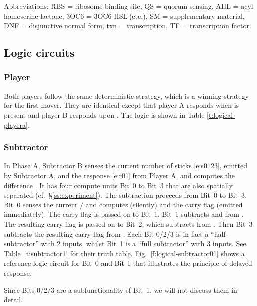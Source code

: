 \documentclass[12pt,notitlepage]{article}
\begin{document}
%
%

Abbreviations:
RBS = ribosome binding site,
QS = quorum sensing,
AHL = acyl homoserine lactone,
{3OC6} = {3OC6}{-}HSL (etc.),
SM = supplementary material,
DNF = disjunctive normal form,
txn = transcription,
TF = transcription factor.  %


\subsection{Logic circuits}


\subsubsection*{Player} \label{ss:players}

Both players
follow the same deterministic strategy,
which is a winning strategy for the first-mover.
%
They are identical except
that player A responds when  is present
and player B responds upon .
%
The logic is shown in Table \ref{t:logical-playera}.


\subsubsection*{Subtractor} \label{ss:sub}

In Phase A,
Subtractor B 
senses the current number of sticks \eqref{e:s0123},
emitted by Subtractor A,
and 
the response \eqref{e:r01} from Player A,
and
computes the difference .
%
It has four compute units Bit~0 to Bit~3
that are also
spatially separated (cf.~\S\ref{ss:experiment}). 
%
The subtraction proceeds from Bit~0 to Bit~3.
%
Bit~0 senses the current /
and computes  (silently)
and the carry flag  (emitted immediately).
%
The carry flag is passed on to Bit~1.
%
Bit~1 subtracts  and  from . 
%
The resulting carry flag  
is passed on to Bit~2, 
which subtracts  from .
%
Then Bit~3 subtracts the resulting carry flag
 from .
%
Each Bit 0/2/3
is in fact a ``half-subtractor'' with 2 inputs,
whilst
Bit~1 is a ``full subtractor'' with 3 inputs.
%
%
%
See
Table~\ref{t:subtractor1}
for their truth table.
%
Fig.~\ref{f:logical-subtractor01}
shows a reference logic circuit 
for Bit~0 and Bit~1
that illustrates the principle of delayed response.
%
%
%

Since
Bits 0/2/3 
are a subfunctionality of Bit~1,
we will not discuss them in detail.
\end{document}
